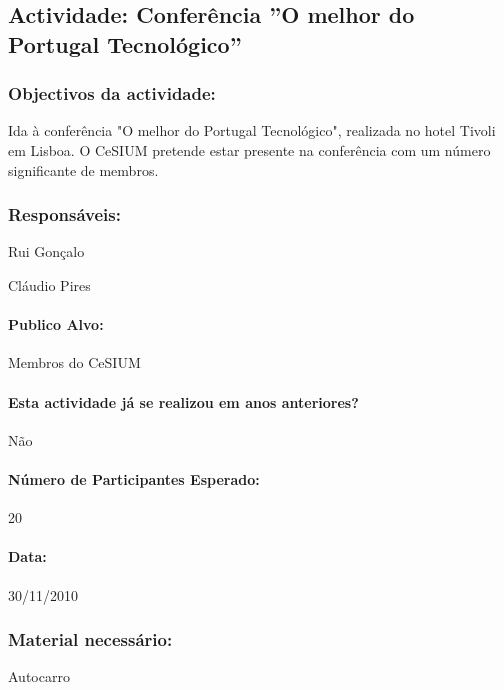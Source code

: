 
\subsection{Actividade: Conferência ''O melhor do Portugal Tecnológico''} %

\subsubsection*{Objectivos da actividade:}
Ida à conferência "O melhor do Portugal Tecnológico", realizada no hotel Tivoli em Lisboa. O CeSIUM pretende estar presente na conferência com um número significante de membros.

\subsubsection*{Responsáveis:}
\begin{itemizedash}
	\item{Rui Gonçalo}
	\item{Cláudio Pires}
\end{itemizedash}

\paragraph{Publico Alvo: }
Membros do CeSIUM

\paragraph{Esta actividade já se realizou em anos anteriores?}
Não

\paragraph{Número de Participantes Esperado:}
20

\paragraph{Data:} 30/11/2010

\subsubsection*{Material necessário:}
\begin{itemizedash}
	\item{Autocarro}
\end{itemizedash}

